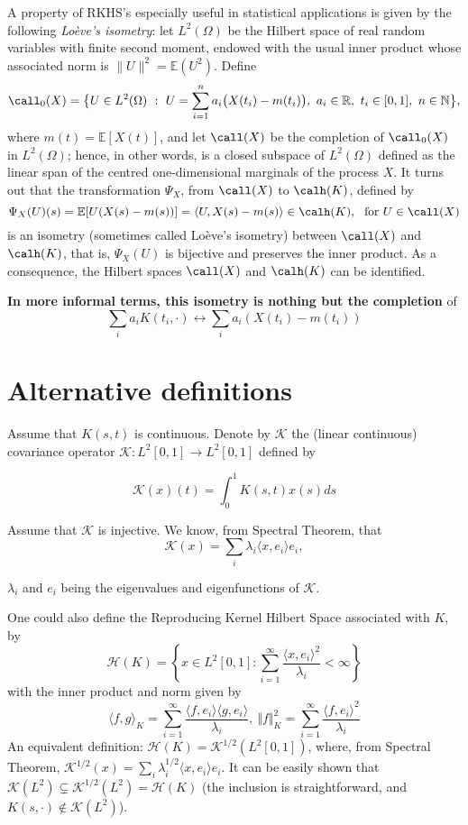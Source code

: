 	A property of RKHS's especially useful in statistical applications is given by the following \textit{Lo\`eve's isometry}:  let $L^2(\Omega) $ be the Hilbert space of real random variables with finite second moment, endowed with the usual inner product whose associated norm is $\| U\|^2={\mathbb E}(U^2)$. Define
	$$\call_0(X) = \big\{U\in L^2(\Omega) \ : \ U=\sum_{i=1}^n a_i \big(X(t_i)-m(t_i)\big),\ a_i\in{\mathbb R},\ t_i\in[0,1],\ n\in{\mathbb N}\big\},$$
	where $m(t)={\mathbb E}[X(t)]$, and let $\call(X)$ be the completion of $\call_0(X)$ in  $L^2(\Omega)$; hence, in other words, is a closed subspace of $L^2(\Omega)$ defined as the linear span of the centred one-dimensional marginals of the process $X$. It turns out that the transformation $\Psi_X$, from  $\call(X)$ to $\calh(K)$, defined by
	\begin{equation}\label{eq:isometry}
	\Psi_X(U)(s) = {\mathbb E}[ U(X(s)-m(s))] = \langle U, X(s)-m(s) \rangle \in \calh(K), \ \text{ for } U\in \call(X)
	\end{equation}
	is an isometry (sometimes called Lo\`eve's isometry) between $\call(X)$ and $\calh(K)$, that is, $\Psi_X(U)$ is bijective and preserves the inner product. As a consequence, the Hilbert spaces $\call(X)$ and $\calh(K)$ can be identified.

	\textbf{In more informal terms, this isometry is nothing but the completion} of
	$$
	\sum_ia_iK(t_i,\cdot)\longleftrightarrow \sum_ia_i(X(t_i)-m(t_i))
	$$

\section*{Alternative definitions}

	Assume that $K(s,t)$ is continuous. Denote by ${\mathcal K}$ the (linear continuous) covariance operator ${\mathcal K}:L^2[0,1]\rightarrow L^2[0,1]$ defined by

	$$
	{\mathcal K}(x)(t)=\int_0^1K(s,t)x(s)ds
	$$

	Assume that ${\mathcal K}$ is injective.
	We know, from Spectral Theorem, that
	$${\mathcal K}(x)=\sum_i\lambda_i\langle x,e_i\rangle e_i,$$

	$\lambda_i$ and $e_i$ being the eigenvalues and eigenfunctions of ${\mathcal K}$.

		One could also define the Reproducing Kernel Hilbert Space associated with $K$, by
$$
	{\mathcal H}(K)=\left\{x\in L^2[0,1]:  \sum_{i=1}^\infty\frac{\langle x,e_i\rangle^2}{\lambda_i} <\infty \right\}
	$$
	with the inner product and norm given by
	$$
	\langle f,g\rangle_K=\sum_{i=1}^\infty \frac{\langle f,e_i\rangle \langle g,e_i\rangle}{\lambda_i},\ \Vert f\Vert_K^2=\sum_{i=1}^\infty \frac{\langle f,e_i\rangle^2 }{\lambda_i}
	$$
An equivalent definition:
	${\mathcal H}(K)={\mathcal K}^{1/2}(L^2[0,1])$,
	where, from Spectral Theorem, ${\mathcal K}^{1/2}(x)=\sum_i\lambda_i^{1/2}\langle x,e_i\rangle e_i$. It can be easily shown that ${\mathcal K}(L^2) \varsubsetneq {\mathcal K}^{1/2}(L^2)=\mathcal H(K)$ (the inclusion is straightforward, and $K(s, \cdot)\notin \mathcal K(L^2)$).

